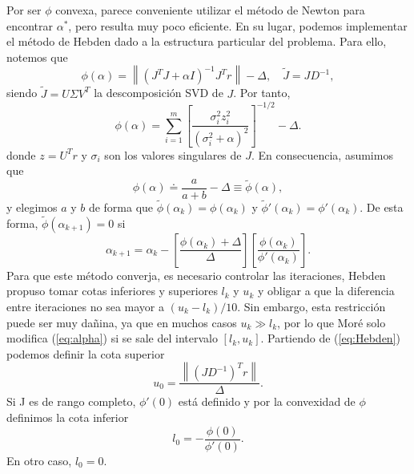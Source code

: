 \documentclass[11pt,a4paper]{book}
\theoremstyle{definition}
\theoremstyle{remark}
\newcommand{\norm}[1]{\left\lVert#1\right\rVert}
\begin{document}
Por ser $\phi$ convexa, parece conveniente utilizar el método de Newton para encontrar $\alpha^*$,
pero resulta muy poco eficiente. En su lugar, podemos implementar el método de Hebden
\cite{Hebden1973AnAF} dado a la estructura particular del problema. Para ello, notemos que
\begin{equation}\label{eq:Hebden}
	\phi(\alpha) = \norm{(J^TJ+\alpha I)^{-1}J^Tr}-\Delta, \quad \tilde{J} = JD^{-1},
\end{equation}
siendo $\tilde{J}=U\Sigma V^T$ la descomposición SVD de $J$. Por tanto,
\begin{equation}
	\phi(\alpha) = \sum_{i=1}^m \left[\frac{\sigma_i^2z_i^2}
											{(\sigma_i^2+\alpha)^2}\right]^{-1/2}-\Delta.
\end{equation}
donde $z=U^Tr$ y $\sigma_i$ son los valores singulares de $J$. En consecuencia, asumimos que
\begin{equation}
\phi(\alpha) \doteq \frac{a}{a+b}-\Delta \equiv \tilde{\phi}(\alpha),
\end{equation}
y elegimos $a$ y $b$ de forma que $\tilde{\phi}(\alpha_k)=\phi(\alpha_k)$ y
$\tilde{\phi}'(\alpha_k)=\phi'(\alpha_k)$. De esta forma, $\tilde{\phi}(\alpha_{k+1})=0$
si
\begin{equation}\label{eq:alpha}
	\alpha_{k+1} = \alpha_k - \left[\frac{\phi(\alpha_k)+\Delta}{\Delta}\right]
					\left[\frac{\phi(\alpha_k)}{\phi'(\alpha_k)}\right].
\end{equation}
Para que este método converja, es necesario controlar las iteraciones, Hebden propuso tomar cotas
inferiores y superiores $l_k$ y $u_k$ y obligar a que la diferencia entre iteraciones
no sea mayor a $(u_k-l_k)/10$. Sin embargo, esta restricción puede ser muy dañina, ya que
en muchos casos $u_k\gg l_k$, por lo que Moré solo modifica (\ref{eq:alpha}) si se sale del intervalo
$[l_k, u_k]$. Partiendo de (\ref{eq:Hebden}) podemos definir la cota superior
\begin{equation}
	u_0 = \frac{\norm{(JD^{-1})^Tr}}{\Delta}.
\end{equation}
Si J es de rango completo, $\phi'(0)$ está definido y por la convexidad de $\phi$
definimos la cota inferior
\begin{equation}
	l_0 = -\frac{\phi(0)}{\phi'(0)}.
\end{equation}
En otro caso, $l_0=0$.
\end{document}
